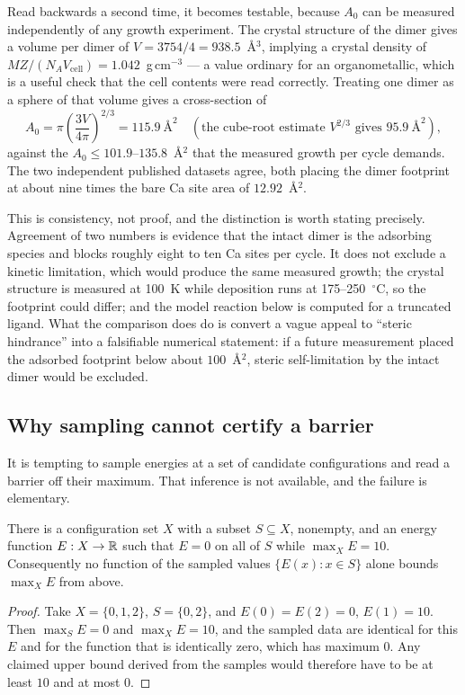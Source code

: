 Read backwards a second time, it becomes testable, because $A_0$ can be
measured independently of any growth experiment. The crystal structure of the
dimer \citep{Kim2016} gives a volume per dimer of
$V=3754/4=938.5$~\AA$^3$, implying a crystal density of
$MZ/(N_A V_{\mathrm{cell}})=1.042$~g\,cm$^{-3}$ --- a value ordinary for an
organometallic, which is a useful check that the cell contents were read
correctly. Treating one dimer as a sphere of that volume gives a cross-section
of
\[
A_0 = \pi\left(\frac{3V}{4\pi}\right)^{2/3} = 115.9\ \text{\AA}^2
  \quad (\text{the cube-root estimate } V^{2/3} \text{ gives } 95.9\ \text{\AA}^2),
\]
against the $A_0\le101.9$--$135.8$~\AA$^2$ that the measured growth per cycle
demands. The two independent published datasets agree, both placing the dimer
footprint at about nine times the bare Ca site area of $12.92$~\AA$^2$.

\begin{remark}
This is consistency, not proof, and the distinction is worth stating precisely.
Agreement of two numbers is evidence that the intact dimer is the adsorbing
species and blocks roughly eight to ten Ca sites per cycle. It does not exclude
a kinetic limitation, which would produce the same measured growth; the crystal
structure is measured at 100~K while deposition runs at 175--250~$^\circ$C, so
the footprint could differ; and the model reaction below is computed for a
truncated ligand. What the comparison does do is convert a vague appeal to
``steric hindrance'' into a falsifiable numerical statement: if a future
measurement placed the adsorbed footprint below about $100$~\AA$^2$, steric
self-limitation by the intact dimer would be excluded.
\end{remark}

\subsection{Why sampling cannot certify a barrier}

It is tempting to sample energies at a set of candidate configurations and read
a barrier off their maximum. That inference is not available, and the failure
is elementary.

\begin{theorem}
\label{thm:nosampling}
There is a configuration set $X$ with a subset $S\subseteq X$, nonempty, and an
energy function $E:X\to\mathbb{R}$ such that $E=0$ on all of $S$ while
$\max_X E = 10$. Consequently no function of the sampled values
$\{E(x):x\in S\}$ alone bounds $\max_X E$ from above.
\end{theorem}
\begin{proof}
Take $X=\{0,1,2\}$, $S=\{0,2\}$, and $E(0)=E(2)=0$, $E(1)=10$. Then
$\max_S E = 0$ and $\max_X E = 10$, and the sampled data are identical for this
$E$ and for the function that is identically zero, which has maximum $0$. Any
claimed upper bound derived from the samples would therefore have to be at
least $10$ and at most $0$.
\end{proof}

